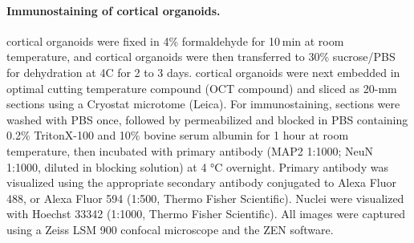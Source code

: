 \paragraph{Immunostaining of cortical organoids.}
cortical organoids were fixed in 4\% formaldehyde for 10 min at room temperature, and cortical organoids were then transferred to 30\% sucrose/PBS for dehydration at 4C for 2 to 3 days. cortical organoids were next embedded in optimal cutting temperature compound (OCT compound) and sliced as 20-mm sections using a Cryostat microtome (Leica). For immunostaining, sections were washed with PBS once, followed by permeabilized and blocked in PBS containing 0.2\% TritonX-100 and 10\% bovine serum albumin for 1 hour at room temperature, then incubated with primary antibody (MAP2 1:1000; NeuN 1:1000, diluted in blocking solution) at 4 °C overnight. Primary antibody was visualized using the appropriate secondary antibody conjugated to Alexa Fluor 488, or Alexa Fluor 594 (1:500, Thermo Fisher Scientific). Nuclei were visualized with Hoechst 33342 (1:1000, Thermo Fisher Scientific). All images were captured using a Zeiss LSM 900 confocal microscope and the ZEN software. 